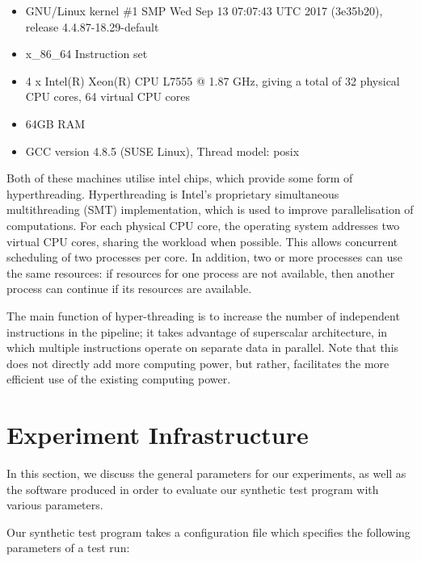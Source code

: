 \begin{itemize}
    \item GNU/Linux kernel \#1 SMP Wed Sep 13 07:07:43 UTC 2017 (3e35b20), release 4.4.87-18.29-default
    \item x\_86\_64 Instruction set
    \item 4 x Intel(R) Xeon(R) CPU L7555 @ 1.87 GHz, giving a total of 32 physical CPU cores, 64 virtual CPU cores
    \item 64GB RAM
    \item GCC version 4.8.5 (SUSE Linux), Thread model: posix
\end{itemize}

Both of these machines utilise intel chips, which provide some form of hyperthreading. Hyperthreading is Intel's proprietary simultaneous multithreading (SMT) implementation, which is used to improve parallelisation of computations. For each physical CPU core, the operating system addresses two virtual CPU cores, sharing the workload when possible. This allows concurrent scheduling of two processes per core. In addition, two or more processes can use the same resources: if resources for one process are not available, then another process can continue if its resources are available. 

The main function of hyper-threading is to increase the number of independent instructions in the pipeline; it takes advantage of superscalar architecture, in which multiple instructions operate on separate data in parallel. Note that this does not directly add more computing power, but rather, facilitates the more efficient use of the existing computing power.



\section{Experiment Infrastructure}
\label{section:experimental_methodology:experiment_infrastructure}

In this section, we discuss the general parameters for our experiments, as well as the software produced in order to evaluate our synthetic test program with various parameters.

Our synthetic test program takes a configuration file which specifies the following parameters of a test run:

